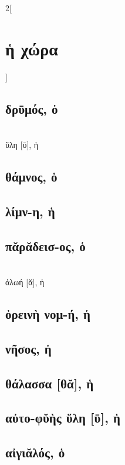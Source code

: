 \documentclass{book}
\begin{document}
\begin{multicols}{2}[\section{ἡ χώρα}]
\subsection{δρῡμός, ὁ}
 ~\\
ὕλη [ῡ], ἡ 
\subsection{θάμνος, ὁ}
\subsection{λίμν-η, ἡ}
\subsection{πᾰρᾰδεισ-ος, ὁ}
 ~\\
ἀλωή [ᾰ], ἡ
\subsection{ὀρεινὴ νομ-ή, ἡ} 
\subsection{νῆσος, ἡ}
\subsection{θάλασσα [θᾰ], ἡ}
\subsection{αὐτο-φῠὴς ὕλη [ῡ], ἡ}
\subsection{αἰγιᾰλός, ὁ}
~
\end{multicols}
\newpage  
\end{document}
